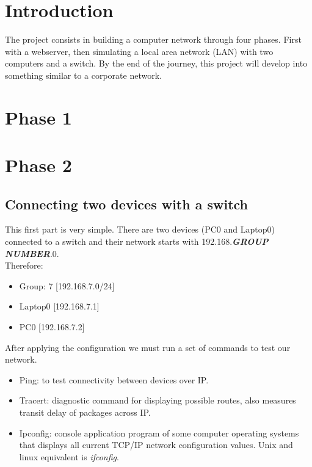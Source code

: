 \documentclass[11pt,a4paper]{report}
\begin{document}
\chapter{Introduction}
    \pagestyle{fancy}
    The project consists in building a computer network through four phases. First with a webserver, then simulating a local area network (LAN) with two computers and a switch.
    By the end of the journey, this project will develop into something similar to a corporate network.


    \setcounter{page}{1}

\chapter{Phase 1}
\chapter{Phase 2}
    \section{Connecting two devices with a switch}
        This first part is very simple. There are two devices (PC0 and Laptop0) connected to a switch and their network starts with 192.168.\textbf{\textit{GROUP NUMBER}}.0.\\
        Therefore:

        \begin{itemize}
            \item Group: 7 [192.168.7.0/24]
            \item Laptop0  [192.168.7.1]
            \item PC0      [192.168.7.2]
        \end{itemize}

        After applying the configuration we must run a set of commands to test our network.
        \begin{itemize}
            \item Ping: to test connectivity between devices over IP.
            \item Tracert: diagnostic command for displaying possible routes, also measures transit delay of packages across IP.
            \item Ipconfig: console application program of some computer operating systems that displays all current TCP/IP network configuration values. Unix and linux equivalent is \textit{ifconfig}.
        \end{itemize}
\end{document}
